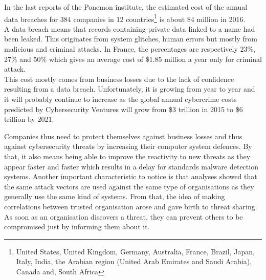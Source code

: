 \documentclass{eplmastersthesis}
\begin{document}
In the last reports of the Ponemon institute\cite{ponemon2016cost, ponemon2016costFr}, the estimated cost of the annual data breaches for 384 companies in 12 countries\footnote{United States, United Kingdom, Germany, Australia, France, Brazil, Japan, Italy, India, the Arabian region (United Arab Emirates and Saudi Arabia), Canada and, South Africa} is about \$4 million in 2016.\\
A data breach means that records containing private data linked to a name had been leaked. This originates from system glitches, human errors but  mostly from malicious and criminal attacks. In France, the percentages are respectively 23\%, 27\% and 50\% which gives an average cost of \$1.85 million a year only for criminal attack.\\
This cost mostly comes from business losses due to the lack of confidence resulting from a data breach. Unfortunately, it is growing from year to year and it will probably continue to increase as the global annual cybercrime costs predicted by Cybersecurity Ventures will grow from  \$3 trillion in 2015 to \$6 trillion by 2021.

Companies thus need to protect themselves against business losses and thus against cybersecurity threats by increasing their computer system defences. By that, it also means being able to improve the reactivity to new threats as they appear faster and faster which results in a delay for standards malware detection systems. Another important characteristic to notice is that analyses showed that the same attack vectors are used against the same type of organisations as they generally use the same kind of systems. From that, the idea of making correlations between trusted organisation arose and gave birth to threat sharing.  As soon as an organisation discovers a threat, they can prevent others to be compromised just by informing them about it.\\
\end{document}
